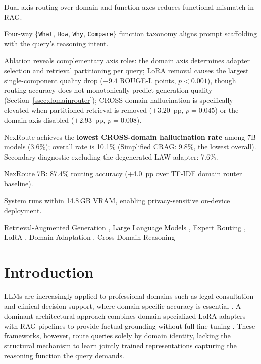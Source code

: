 \documentclass[a4paper,fleql]{cas-sc}
\begin{document}
\begin{highlights}
    \item Dual-axis routing over domain and function axes reduces
    functional mismatch in RAG.
    \item Four-way \{\texttt{What}, \texttt{How}, \texttt{Why}, \texttt{Compare}\}
    function taxonomy aligns prompt scaffolding with the query's reasoning intent.
    \item Ablation reveals complementary axis roles: the domain axis determines
    adapter selection and retrieval partitioning per query; LoRA removal causes the
    largest single-component quality drop ($-9.4$ ROUGE-L points, $p{<}0.001$),
    though routing accuracy does not monotonically predict generation quality
    (Section~\ref{ssec:domainrouter}); CROSS-domain hallucination is specifically
    elevated when partitioned retrieval is removed ($+3.20$~pp, $p{=}0.045$)
    or the domain axis disabled ($+2.93$~pp, $p{=}0.008$).
    \item NexRoute achieves the \textbf{lowest CROSS-domain hallucination rate}
    among 7B models (3.6\%); overall rate is 10.1\% (Simplified CRAG: 9.8\%,
    the lowest overall). Secondary diagnostic excluding the degenerated LAW adapter: 7.6\%.
    \item NexRoute 7B: 87.4\% routing accuracy (+4.0~pp over TF-IDF domain router baseline).
    \item System runs within 14.8\,GB VRAM, enabling privacy-sensitive
    on-device deployment.
\end{highlights}
\begin{keywords}
Retrieval-Augmented Generation \sep
Large Language Models \sep
Expert Routing \sep
LoRA \sep
Domain Adaptation \sep
Cross-Domain Reasoning
\end{keywords}
\maketitle

\section{Introduction}
\label{sec:introduction}

LLMs are increasingly applied to professional domains such as legal
consultation and clinical decision support, where domain-specific accuracy
is essential \citep{brown2020gpt,touvron2023llama,singhal2023large}.
A dominant architectural approach combines domain-specialized LoRA adapters
with RAG pipelines to provide factual grounding without full fine-tuning
\citep{hu2022lora,shazeer2017outrageously,dou2024loramoe}. These frameworks,
however, route queries solely by domain identity, lacking the structural
mechanism to learn jointly trained representations capturing the reasoning function
the query demands.
\end{document}
